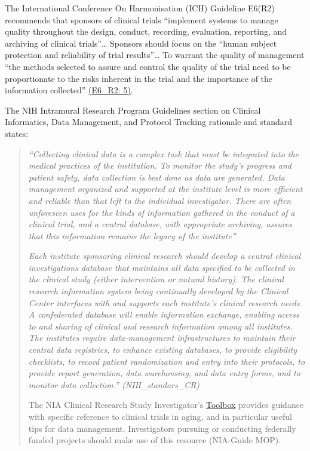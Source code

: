 \documentclass[]{book}
\theoremstyle{definition}
\theoremstyle{definition}
\theoremstyle{definition}
\theoremstyle{remark}
\begin{document}
The International Conference On Harmonisation (ICH) Guideline E6(R2)
recommends that sponsors of clinical trials ``implement systems to
manage quality throughout the design, conduct, recording, evaluation,
reporting, and archiving of clinical trials''\ldots{} Sponsors should
focus on the ``human subject protection and reliability of trial
results''\ldots{} To warrant the quality of management ``the methods
selected to assure and control the quality of the trial need to be
proportionate to the risks inherent in the trial and the importance of
the information collected''
\href{http://www.ich.org/fileadmin/Public_Web_Site/ICH_Products/Guidelines/Efficacy/E6/E6_R2__Addendum_Step2.pdf}{(E6\_R2:
5)}.

The NIH Intramural Research Program Guidelines section on Clinical
Informatics, Data Management, and Protocol Tracking rationale and
standard states:

\begin{quote}
\emph{``Collecting clinical data is a complex task that must be
integrated into the medical practices of the institution. To monitor the
study's progress and patient safety, data collection is best done as
data are generated. Data management organized and supported at the
institute level is more efficient and reliable than that left to the
individual investigator. There are often unforeseen uses for the kinds
of information gathered in the conduct of a clinical trial, and a
central database, with appropriate archiving, assures that this
information remains the legacy of the institute'' }

\emph{Each institute sponsoring clinical research should develop a
central clinical investigations database that maintains all data
specified to be collected in the clinical study (either intervention or
natural history). The clinical research information system being
continually developed by the Clinical Center interfaces with and
supports each institute's clinical research needs. A confederated
database will enable information exchange, enabling access to and
sharing of clinical and research information among all institutes. The
institutes require data-management infrastructures to maintain their
central data registries, to enhance existing databases, to provide
eligibility checklists, to record patient randomization and entry into
their protocols, to provide report generation, data warehousing, and
data entry forms, and to monitor data collection.'' (NIH\_standars\_CR)}

The NIA Clinical Research Study Investigator's
\href{http://webcache.googleusercontent.com/search?q=cache:LN9CyBbTsN4J:https://www.nia.nih.gov/sites/default/files/manualofproceduresmopfinal2_0.doc+\&cd=1\&hl=en\&ct=clnk\&gl=us}{Toolbox}
provides guidance with specific reference to clinical trials in aging,
and in particular useful tips for data management. Investigators
pursuing or conducting federally funded projects should make use of this
resource (NIA-Guide MOP).
\end{quote}
\end{document}
